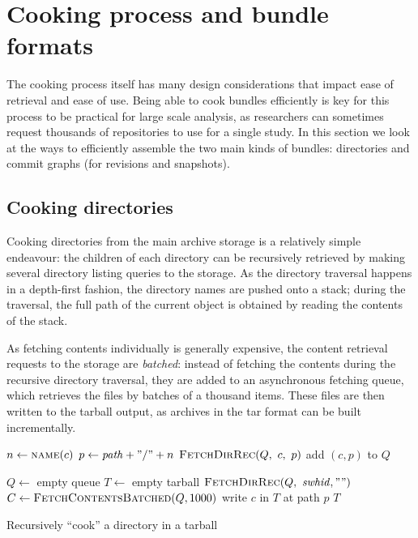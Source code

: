 \section{Cooking process and bundle formats}

The cooking process itself has many design considerations that impact ease of
retrieval and ease of use. Being able to cook bundles efficiently is key for
this process to be practical for large scale analysis, as researchers can
sometimes request thousands of repositories to use for a single study. In this
section we look at the ways to efficiently assemble the two main kinds of
bundles: directories and commit graphs (for revisions and snapshots).

\subsection{Cooking directories}

Cooking directories from the main archive storage is a relatively simple
endeavour: the children of each directory can be recursively retrieved by
making several directory listing queries to the storage. As the directory
traversal happens in a depth-first fashion, the directory names are pushed onto
a stack; during the traversal, the full path of the current object is obtained
by reading the contents of the stack.

As fetching contents individually is generally expensive, the content retrieval
requests to the storage are \emph{batched}: instead of fetching the contents
during the recursive directory traversal, they are added to an asynchronous
fetching queue, which retrieves the files by batches of a thousand items. These
files are then written to the tarball output, as archives in the tar format can
be built incrementally.


\begin{algorithm}[t]
    \begin{algorithmic}
            \State $n \gets \Call{name}{c}$
            \State $p \gets \mathit{path} + "/" + n$
                \State $\Call{FetchDirRec}{Q,~c,~p}$
            \Else
                \State add $(c, p)$ to $Q$
            \EndIf
        \EndFor
        \EndFunction

        \State $Q \gets$ empty queue  
        \State $T \gets$ empty tarball  
        \State $\Call{FetchDirRec}{Q,~\mathit{swhid}, ""}$
        \State $C \gets \Call{FetchContentsBatched}{Q, 1000}$
            \State write $c$ in $T$ at path $p$
        \EndFor
        \State \Return $T$
        \EndFunction
    \end{algorithmic}

    \caption{Recursively ``cook'' a directory in a tarball}%
    \label{algo:cooking-directory}
\end{algorithm}


